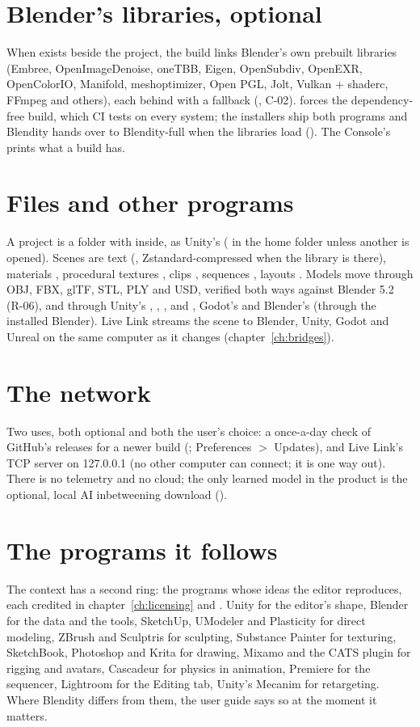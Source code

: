 \section{Blender's libraries, optional}
When  exists beside the project, the build links Blender's own prebuilt libraries
(Embree, OpenImageDenoise, oneTBB, Eigen, OpenSubdiv, OpenEXR, OpenColorIO, Manifold, meshoptimizer, Open PGL, Jolt,
Vulkan + shaderc, FFmpeg and others), each behind  with a fallback (, C-02).
 forces the dependency-free build, which CI tests on every system; the installers ship both
programs and Blendity hands over to Blendity-full when the libraries load (). The Console's  prints
what a build has.

\section{Files and other programs}
A project is a folder with  inside, as Unity's ( in the home folder unless another is
opened). Scenes are text (, Zstandard-compressed when the library is there), materials ,
procedural textures , clips , sequences , layouts . Models move
through OBJ, FBX, glTF, STL, PLY and USD, verified both ways against Blender 5.2 (R-06), and through Unity's
, , ,  and , Godot's  and Blender's
 (through the installed Blender). Live Link streams the scene to Blender, Unity, Godot and Unreal on the
same computer as it changes (chapter~\ref{ch:bridges}).

\section{The network}
Two uses, both optional and both the user's choice: a once-a-day check of GitHub's releases for a newer build
(; Preferences $>$ Updates), and Live Link's TCP server on 127.0.0.1 (no other computer can
connect; it is one way out). There is no telemetry and no cloud; the only learned model in the product is the optional,
local AI inbetweening download ().

\section{The programs it follows}
The context has a second ring: the programs whose ideas the editor reproduces, each credited in chapter~\ref{ch:licensing}
and . Unity for the editor's shape, Blender for the data and the tools, SketchUp, UModeler and
Plasticity for direct modeling, ZBrush and Sculptris for sculpting, Substance Painter for texturing, SketchBook, Photoshop
and Krita for drawing, Mixamo and the CATS plugin for rigging and avatars, Cascadeur for physics in animation, Premiere
for the sequencer, Lightroom for the Editing tab, Unity's Mecanim for retargeting. Where Blendity differs from them, the
user guide says so at the moment it matters.
